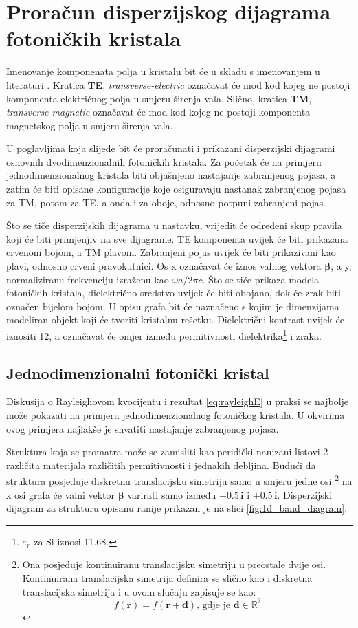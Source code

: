 \documentclass[utf8, seminar, numeric]{fer}
\begin{document}
\chapter{Proračun disperzijskog dijagrama fotoničkih kristala}

Imenovanje komponenata polja u kristalu bit će u skladu s imenovanjem u
literaturi \cite{joannopoulos2011photonic}. Kratica \textbf{TE},
\textit{transverse-electric} označavat će mod kod kojeg ne postoji komponenta
električnog polja u smjeru širenja vala. Slično, kratica \textbf{TM},
\textit{transverse-magnetic} označavat će mod kod kojeg ne postoji komponenta
magnetskog polja u smjeru širenja vala.

U poglavljima koja slijede bit će proračunati i prikazani disperzijski dijagrami
osnovnih dvodimenzionalnih fotoničkih kristala. Za početak će na primjeru
jednodimenzionalnog kristala biti objašnjeno nastajanje zabranjenog pojasa, a
zatim će biti opisane konfiguracije koje osiguravaju nastanak zabranjenog pojasa
za TM, potom za TE, a onda i za oboje, odnosno potpuni zabranjeni pojas.

Što se tiče disperzijskih dijagrama u nastavku, vrijedit će određeni skup pravila
koji će biti primjenjiv na sve dijagrame. TE komponenta uvijek će biti prikazana
crvenom bojom, a TM plavom. Zabranjeni pojas uvijek će biti prikazivani kao
plavi, odnosno crveni pravokutnici. Os x označavat će iznos valnog vektora
${\bm{\beta}}$, a y, normaliziranu frekvenciju izraženu kao
${\omega a/ 2 \pi c}$. Što se tiče prikaza modela fotoničkih kristala,
dielektrično sredstvo uvijek će biti obojano, dok će zrak biti označen bijelom
bojom. U opisu grafa bit će naznačeno s kojim je dimenzijama modeliran objekt
koji će tvoriti kristalnu rešetku. Dielektrični kontrast uvijek će iznositi 12,
a označavat će omjer između permitivnosti dielektrika\footnote{
$\varepsilon_r$ za Si iznosi 11.68.} i zraka.


\section{Jednodimenzionalni fotonički kristal}

Diskusija o Rayleighovom kvocijentu i rezultat \ref{eq:rayleighE} u praksi se
najbolje može pokazati na primjeru jednodimenzionalnog fotoničkog kristala.
U okvirima ovog primjera najlakše je shvatiti nastajanje zabranjenog pojasa.

Struktura koja se promatra može se zamisliti kao peridički nanizani listovi 2
različita materijala različitih permitivnosti i jednakih debljina. Budući da
struktura posjeduje diskretnu translacijsku simetriju samo u smjeru jedne osi
\footnote{
	Ona posjeduje kontinuiranu translacijsku simetriju u preostale dvije osi.
	Kontinuirana translacijska simetrija definira se slično kao i diskretna
	translacijska simetrija i u ovom slučaju zapisuje se kao:
	$$f(\mathbf{r}) = f(\mathbf{r} + \mathbf{d})
	\text{, gdje je }{\mathbf{d} \in \mathbb{R}^2}$$
}
na x osi grafa će valni vektor ${\bm{\beta}}$ varirati samo između
$-0.5 \, \mathbf{i}$ i $+0.5 \, \mathbf{i}$. Disperzijski
dijagram za strukturu opisanu ranije prikazan je na slici
\ref{fig:1d_band_diagram}.
\end{document}
